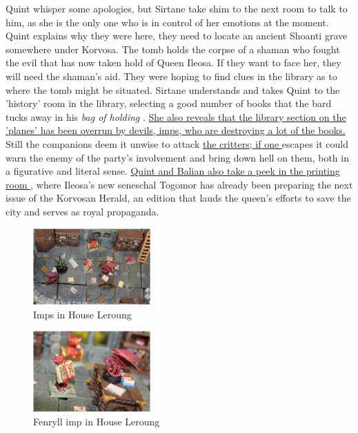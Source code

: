 Quint whisper some apologies, but Sirtane take shim to the next room to talk to him, as she is the only one who is in control of her emotions at the moment. Quint explains why they were here, they need to locate an ancient Shoanti grave somewhere under Korvosa. The tomb holds the corpse of a shaman who fought the evil that has now taken hold of Queen Ileosa. If they want to face her, they will need the shaman's aid. They were hoping to find clues in the library as to where the tomb might be situated. Sirtane understands and takes Quint to the 'history' room in the library, selecting a good number of books that the bard tucks away in his {\itshape bag of holding} . \hyperref[fig:Imps-in-House-Leroung-610269783]{ She also reveals that the library section on the 'planes' has been overrun by devils, imps, who are destroying a lot of the books. } Still the companions deem it unwise to attack \hyperref[fig:Fenryll-imp-in-House-Leroung-610270410]{ the critters; if one } escapes it could warn the enemy of the party's involvement and bring down hell on them, both in a figurative and literal sense. \hyperref[fig:Printing-press-in-House-Leroung-610271575]{ Quint and Balian also take a peek in the printing room } , where Ileosa's new seneschal Togomor has already been preparing the next issue of the Korvosan Herald, an edition that lauds the queen's efforts to save the city and serves as royal propaganda. \\

\begin{figure}[h]
	\centering
	\includegraphics[width=0.4\textwidth]{images/Imps-in-House-Leroung-610269783_mod.jpg}
	\caption{Imps in House Leroung}
	\label{fig:Imps-in-House-Leroung-610269783}
\end{figure}

\begin{figure}[h]
	\centering
	\includegraphics[width=0.4\textwidth]{images/Fenryll-imp-in-House-Leroung-610270410_mod.jpg}
	\caption{Fenryll imp in House Leroung}
	\label{fig:Fenryll-imp-in-House-Leroung-610270410}
\end{figure}

